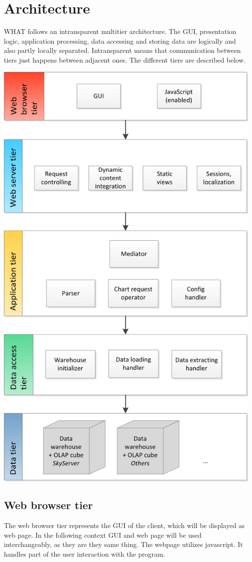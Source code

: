 \section{Architecture}

WHAT follows an intransparent multitier architecture. 
The GUI, presentation logic, application processing, data accessing and storing data
are logically and also partly locally separated. Intransparent means that communication
between tiers just happens between adjacent ones. The different tiers are described below.


\begin{center}
\includegraphics[width=0.6\linewidth]{Pictures/TierArchi.png} 
\end{center}   


\subsection{Web browser tier}
The web browser tier represents the GUI of the client, which will be displayed as web page.
In the following context GUI and web page will be used interchangeably, as they are they same thing.
The webpage utilizes javascript.
It handles part of the user interaction with the program.



